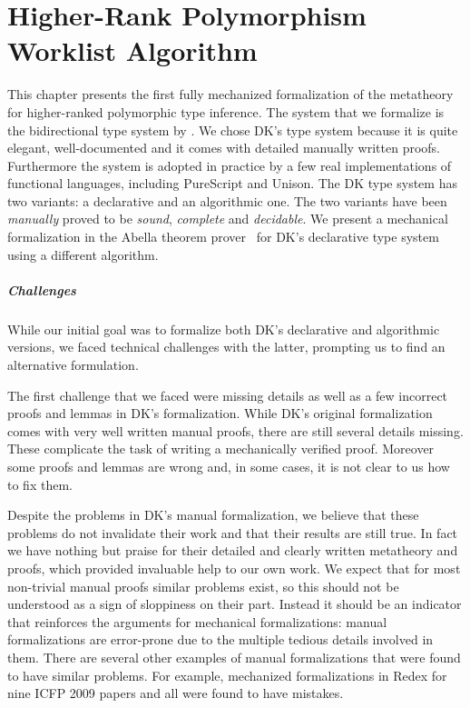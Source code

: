 \chapter{Higher-Rank Polymorphism Worklist Algorithm}
\label{chap:ICFP}

This chapter presents the first fully mechanized formalization of the
metatheory for higher-ranked polymorphic type inference.
The system that we formalize
is the bidirectional type system by \citet{dunfield2013complete}.
We chose DK's type system because it is
quite elegant, well-documented and it comes with detailed manually
written proofs. Furthermore the system is adopted in practice by a few
real implementations of functional languages, including PureScript and
Unison. The DK type system has two variants: a declarative
and an algorithmic one. The two variants have been
\emph{manually} proved to be \emph{sound}, \emph{complete} and
\emph{decidable}.
We present a mechanical formalization in the Abella theorem prover~\citep{AbellaDesc} for
DK's declarative type system using a different algorithm.

\paragraph{Challenges}
While our initial goal was to formalize both DK's declarative and algorithmic
versions, we faced technical challenges with the latter, prompting us to find
an alternative formulation.

The first challenge that we faced were missing details as well as
a few incorrect proofs and lemmas in DK's formalization. While DK's
original formalization comes with very well written manual proofs,
there are still several details missing. These complicate the task of
writing a mechanically verified proof. Moreover some proofs and
lemmas are wrong and, in some cases, it is not clear to us how to fix them.

Despite the problems in DK's manual formalization,
we believe that these problems do not
invalidate their work and that their results are still true.
In fact we have nothing but praise for their detailed
and clearly written metatheory and proofs, which provided invaluable
help to our own work.
We expect that for most non-trivial manual
proofs similar problems exist, so this should not be understood as a sign of sloppiness
on their part. Instead it should be an indicator that reinforces the arguments
for mechanical formalizations: manual formalizations are error-prone due to the multiple
tedious details involved in them.
There are several other examples of manual formalizations that were found to have
similar problems. For example, \citet{KleinRunYourResearch}
mechanized formalizations
in Redex for nine ICFP 2009 papers and all were found to have mistakes.

